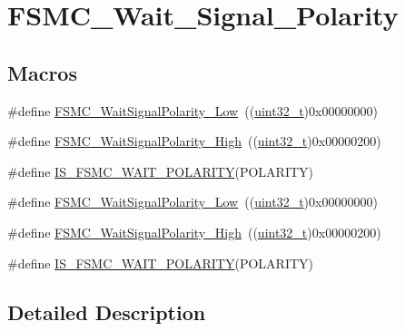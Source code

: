 \hypertarget{group___f_s_m_c___wait___signal___polarity}{}\section{F\+S\+M\+C\+\_\+\+Wait\+\_\+\+Signal\+\_\+\+Polarity}
\label{group___f_s_m_c___wait___signal___polarity}
\subsection*{Macros}
\begin{DoxyCompactItemize}
\item 
\#define \hyperlink{group___f_s_m_c___wait___signal___polarity_ga7dc72fdfc6225e5daa9b8efee8dff49f}{F\+S\+M\+C\+\_\+\+Wait\+Signal\+Polarity\+\_\+\+Low}~((\hyperlink{_p_e___types_8h_a33594304e786b158f3fb30289278f5af}{uint32\+\_\+t})0x00000000)
\item 
\#define \hyperlink{group___f_s_m_c___wait___signal___polarity_ga3418f29249a261edb1359d1bcdc43661}{F\+S\+M\+C\+\_\+\+Wait\+Signal\+Polarity\+\_\+\+High}~((\hyperlink{_p_e___types_8h_a33594304e786b158f3fb30289278f5af}{uint32\+\_\+t})0x00000200)
\item 
\#define \hyperlink{group___f_s_m_c___wait___signal___polarity_gabc5321807d5184fe5cdb7848e1be7bc6}{I\+S\+\_\+\+F\+S\+M\+C\+\_\+\+W\+A\+I\+T\+\_\+\+P\+O\+L\+A\+R\+I\+TY}(P\+O\+L\+A\+R\+I\+TY)
\item 
\#define \hyperlink{group___f_s_m_c___wait___signal___polarity_ga7dc72fdfc6225e5daa9b8efee8dff49f}{F\+S\+M\+C\+\_\+\+Wait\+Signal\+Polarity\+\_\+\+Low}~((\hyperlink{_p_e___types_8h_a33594304e786b158f3fb30289278f5af}{uint32\+\_\+t})0x00000000)
\item 
\#define \hyperlink{group___f_s_m_c___wait___signal___polarity_ga3418f29249a261edb1359d1bcdc43661}{F\+S\+M\+C\+\_\+\+Wait\+Signal\+Polarity\+\_\+\+High}~((\hyperlink{_p_e___types_8h_a33594304e786b158f3fb30289278f5af}{uint32\+\_\+t})0x00000200)
\item 
\#define \hyperlink{group___f_s_m_c___wait___signal___polarity_gabc5321807d5184fe5cdb7848e1be7bc6}{I\+S\+\_\+\+F\+S\+M\+C\+\_\+\+W\+A\+I\+T\+\_\+\+P\+O\+L\+A\+R\+I\+TY}(P\+O\+L\+A\+R\+I\+TY)
\end{DoxyCompactItemize}


\subsection{Detailed Description}


